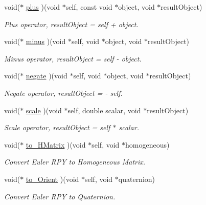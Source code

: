 \begin{CompactItemize}
void($\ast$ \hyperlink{structdrdc__eOrient__t_7f398844060c7b582fdd8b576f94443a}{plus} )(void $\ast$self, const void $\ast$object, void $\ast$resultObject)
\begin{CompactList}\small\item\em Plus operator, resultObject = self + object. \item\end{CompactList}\item 
void($\ast$ \hyperlink{structdrdc__eOrient__t_ef5188ecc6215dd22826b32ae94c8c3e}{minus} )(void $\ast$self, void $\ast$object, void $\ast$resultObject)
\begin{CompactList}\small\item\em Minus operator, resultObject = self - object. \item\end{CompactList}\item 
void($\ast$ \hyperlink{structdrdc__eOrient__t_95d500ab896201c8f4c3822a1432f556}{negate} )(void $\ast$self, void $\ast$object, void $\ast$resultObject)
\begin{CompactList}\small\item\em Negate operator, resultObject = - self. \item\end{CompactList}\item 
void($\ast$ \hyperlink{structdrdc__eOrient__t_23756f8de6f265fd46a43971740c3a1e}{scale} )(void $\ast$self, double scalar, void $\ast$resultObject)
\begin{CompactList}\small\item\em Scale operator, resultObject = self $\ast$ scalar. \item\end{CompactList}\item 
void($\ast$ \hyperlink{structdrdc__eOrient__t_1f0f733ea654b9de7c350049fe7f8e73}{to\_\-HMatrix} )(void $\ast$self, void $\ast$homogeneous)
\begin{CompactList}\small\item\em Convert Euler RPY to Homogeneous Matrix. \item\end{CompactList}\item 
void($\ast$ \hyperlink{structdrdc__eOrient__t_563921c3128004ab185e357400953dee}{to\_\-Orient} )(void $\ast$self, void $\ast$quaternion)
\begin{CompactList}\small\item\em Convert Euler RPY to Quaternion. \item\end{CompactList}\end{CompactItemize}


